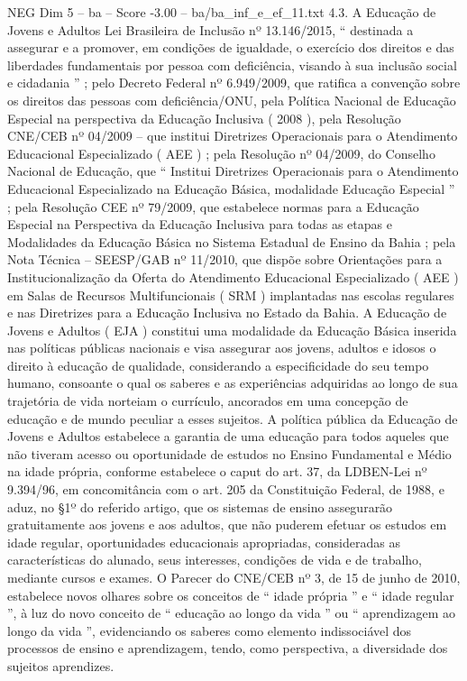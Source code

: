 \begin{textsample}{NEG Dim 5 – ba – Score -3.00 – ba/ba\_inf\_e\_ef\_11.txt}  \label{ex:f5_neg_005}
4.3.
A Educação de Jovens e Adultos Lei Brasileira de Inclusão nº 13.146/2015, “ destinada a assegurar e a promover, em condições de igualdade, o exercício dos direitos e das liberdades fundamentais por pessoa com deficiência, visando à sua inclusão social e cidadania ” ; pelo Decreto Federal nº 6.949/2009, que ratifica a convenção sobre os direitos das pessoas com deficiência/ONU, pela Política Nacional de Educação Especial na perspectiva da Educação Inclusiva ( 2008 ), pela Resolução CNE/CEB nº 04/2009 – que institui Diretrizes Operacionais para o Atendimento Educacional Especializado ( AEE ) ; pela Resolução nº 04/2009, do Conselho Nacional de Educação, que “ Institui Diretrizes Operacionais para o Atendimento Educacional Especializado na Educação Básica, modalidade Educação Especial ” ; pela Resolução CEE nº 79/2009, que estabelece normas para a Educação Especial na Perspectiva da Educação Inclusiva para todas as etapas e Modalidades da Educação Básica no Sistema Estadual de Ensino da Bahia ; pela Nota Técnica – SEESP/GAB nº 11/2010, que dispõe sobre Orientações para a Institucionalização da Oferta do Atendimento Educacional Especializado ( AEE ) em Salas de Recursos Multifuncionais ( SRM ) implantadas nas escolas regulares e nas Diretrizes para a Educação Inclusiva no Estado da Bahia.
A Educação de Jovens e Adultos ( EJA ) constitui uma modalidade da Educação Básica inserida nas políticas públicas nacionais e visa assegurar aos jovens, adultos e idosos o direito à educação de qualidade, considerando a especificidade do seu tempo humano, consoante o qual os saberes e as experiências adquiridas ao longo de sua trajetória de vida norteiam o currículo, ancorados em uma concepção de educação e de mundo peculiar a esses sujeitos.
A política pública da Educação de Jovens e Adultos estabelece a garantia de uma educação para todos aqueles que não tiveram acesso ou oportunidade de estudos no Ensino Fundamental e Médio na idade própria, conforme estabelece o caput do art. 37, da LDBEN-Lei nº 9.394/96, em concomitância com o art. 205 da Constituição Federal, de 1988, e aduz, no §1º do referido artigo, que os sistemas de ensino assegurarão gratuitamente aos jovens e aos adultos, que não puderem efetuar os estudos em idade regular, oportunidades educacionais apropriadas, consideradas as características do alunado, seus interesses, condições de vida e de trabalho, mediante cursos e exames.
O Parecer do CNE/CEB nº 3, de 15 de junho de 2010, estabelece novos olhares sobre os conceitos de “ idade própria ” e “ idade regular ”, à luz do novo conceito de “ educação ao longo da vida ” ou “ aprendizagem ao longo da vida ”, evidenciando os saberes como elemento indissociável dos processos de ensino e aprendizagem, tendo, como perspectiva, a diversidade dos sujeitos aprendizes.

\end{textsample}
